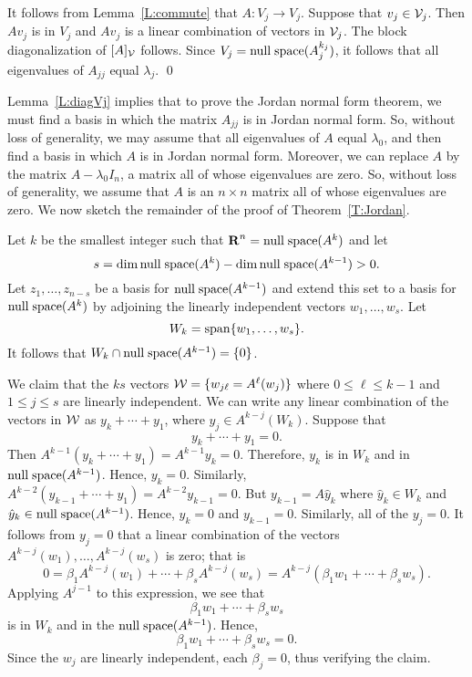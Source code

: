 \proof  It follows from Lemma~\ref{L:commute} that $A:V_j\to V_j$.  Suppose
that $v_j\in {\cal V}_j$.   Then $Av_j$ is in $V_j$ and $Av_j$ is a linear
combination of vectors in ${\cal V}_j$.   The block diagonalization of 
$[A]_{\cal V}$ follows.  Since $V_j={\rm null\;space}(A_j^{k_j})$, it follows that all
eigenvalues of $A_{jj}$ equal $\lambda_j$.   \qed

Lemma~\ref{L:diagVj} implies that to prove the Jordan normal form theorem, 
we must find a basis in which the matrix $A_{jj}$ is in Jordan normal form.  
So, without loss of generality, we may assume that all eigenvalues of $A$ 
equal $\lambda_0$, and then find a basis in which $A$ is in Jordan normal 
form.  Moreover, we can replace $A$ by the matrix $A-\lambda_0I_n$, a
matrix all of whose eigenvalues are zero.  So, without loss of generality, we 
assume that $A$ is an $n\times n$ matrix all of whose eigenvalues are zero.  
We now sketch the remainder of the proof of Theorem~\ref{T:Jordan}.

Let $k$ be the smallest integer such that $\mbox{$\bf{R}$}^n = {\rm null\;space}(A^k)$ and let 
\[
s=\dim{\rm null\;space}(A^k)-\dim{\rm null\;space}(A^{k-1})>0.
\]
Let $z_1,\ldots,z_{n-s}$ be 
a basis for ${\rm null\;space}(A^{k-1})$ and extend this set to a basis for 
${\rm null\;space}(A^k)$ by adjoining the linearly independent vectors $w_1,\ldots,w_s$.  
Let 
\[
W_k={\rm span}\{w_1,\ldots,w_s\}.
\]
It follows that $W_k\cap{\rm null\;space}(A^{k-1})=\{0\}$.  

We claim that the $ks$ vectors ${\cal W}=\{w_{j\ell}=A^\ell(w_j)\}$ where 
$0\le\ell\le {k-1}$ and $1\le j\le s$ are linearly independent.  We can write 
any linear combination of the vectors in ${\cal W}$ as $y_k+\cdots+y_1$, 
where $y_j\in A^{k-j}(W_k)$.  Suppose that 
\[
y_k+\cdots+y_1=0.
\]
Then $A^{k-1}(y_k+\cdots+y_1)= A^{k-1}y_k=0$.  Therefore, $y_k$ is in $W_k$ 
and in ${\rm null\;space}(A^{k-1})$.  Hence, $y_k=0$.  Similarly, 
$A^{k-2}(y_{k-1}+\cdots+y_1)= A^{k-2}y_{k-1}=0$.  But $y_{k-1}=A\hat{y}_k$ 
where $\hat{y}_k\in W_k$ and $\hat{y}_k\in{\rm null\;space}(A^{k-1})$.  Hence, 
$\hat{y}_k=0$ and $y_{k-1}=0$.  Similarly, all of the $y_j=0$.  It follows 
from $y_j=0$ that a linear combination of the vectors 
$A^{k-j}(w_1),\ldots,A^{k-j}(w_s)$ is zero; that is
\[
0 = \beta_1A^{k-j}(w_1) + \cdots + \beta_sA^{k-j}(w_s) =
A^{k-j}(\beta_1w_1+\cdots+\beta_sw_s).
\]
Applying  $A^{j-1}$ to this expression, we see that 
\[
\beta_1w_1+\cdots+\beta_sw_s
\]
is in $W_k$ and in the ${\rm null\;space}(A^{k-1})$.  Hence, 
\[
\beta_1w_1+\cdots+\beta_sw_s = 0.
\]
Since the $w_j$ are linearly independent, each $\beta_j=0$, thus verifying 
the claim.

